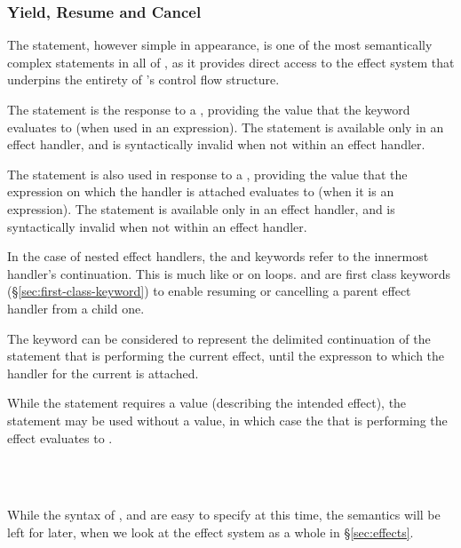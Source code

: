 \subsubsection{Yield, Resume and Cancel}
\label{sec:prose-resume}

The  statement, however simple in appearance, is one of the most
semantically complex statements in all of \Trilogy{}, as it provides direct
access to the effect system that underpins the entirety of \Trilogy{}'s control
flow structure.

The  statement is the response to a , providing the value
that the  keyword evaluates to (when used in an expression). The
 statement is available only in an effect handler, and is syntactically
invalid when not within an effect handler.

The  statement is also used in response to a , providing
the value that the expression on which the handler is attached evaluates to
(when it is an expression). The  statement is available only in an
effect handler, and is syntactically invalid when not within an effect handler.

In the case of nested effect handlers, the  and  keywords refer to the
innermost handler's continuation. This is much like  or 
on loops.  and  are first class keywords (\S\ref{sec:first-class-keyword})
to enable resuming or cancelling a parent effect handler from a child one.

The  keyword can be considered to represent the delimited continuation of
the  statement that is performing the current effect, until the
expresson to which the handler for the current  is attached.

While the  statement requires a value (describing the intended effect), the
 statement may be used without a value, in which case the  that
is performing the effect evaluates to .

\begin{bnf*}
     \\
     \\
\end{bnf*}

While the syntax of ,  and  are easy to specify at
this time, the semantics will be left for later, when we look at the effect system
as a whole in \S\ref{sec:effects}.
